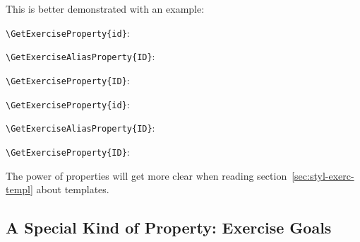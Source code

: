 \documentclass{xsim-manual}
\begin{document}
This is better demonstrated with an example:
\begin{example}
  \begin{exercise}
    \lipsum[4] %
    \verb+\GetExerciseProperty{id}+:  \par
    \verb+\GetExerciseAliasProperty{ID}+:  \par
    \verb+\GetExerciseProperty{ID}+: 
  \end{exercise}
  \begin{exercise}[ID=foo-bar]
    \lipsum[4]
    \verb+\GetExerciseProperty{id}+:  \par
    \verb+\GetExerciseAliasProperty{ID}+:  \par
    \verb+\GetExerciseProperty{ID}+: 
  \end{exercise}
\end{example}

The power of properties will get more clear when reading
section~\vref{sec:styl-exerc-templ} about templates.

\subsection{A Special Kind of Property: Exercise Goals}\label{sec:goals}
\end{document}
